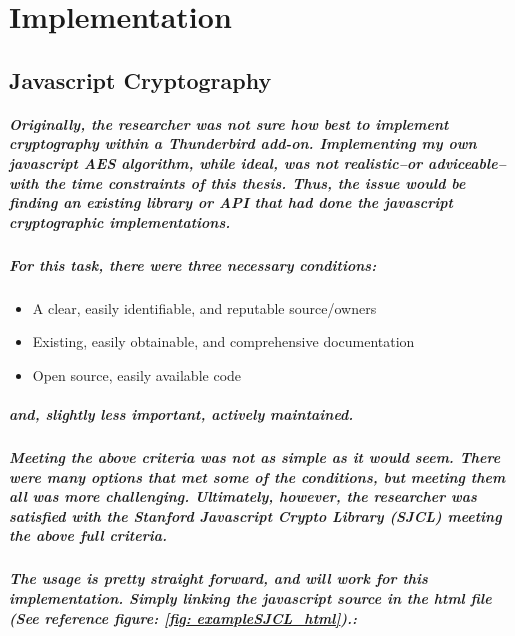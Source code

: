 \chapter{Implementation}



\section{Javascript Cryptography}

\paragraph{Originally, the researcher was not sure how best to implement cryptography within a Thunderbird add-on. Implementing my own javascript AES algorithm, while ideal, was not realistic--or adviceable--with the time constraints of this thesis. Thus, the issue would be finding an existing library or API that had done the javascript cryptographic implementations.}

\paragraph{For this task, there were three necessary conditions:}

\begin{itemize}
\item A clear, easily identifiable, and reputable source/owners
\item Existing, easily obtainable, and comprehensive documentation
\item Open source, easily available code
\end{itemize}

\paragraph{and, slightly less important, actively maintained.}

\paragraph{Meeting the above criteria was not as simple as it would seem. There were many options that met some of the conditions, but meeting them all was more challenging. Ultimately, however, the researcher was satisfied with the Stanford Javascript Crypto Library (SJCL) meeting the above full criteria.}\cite[Website]{SJCL}

\paragraph{The usage is pretty straight forward, and will work for this implementation. Simply linking the javascript source in the html file (See reference figure: \ref{fig: exampleSJCL_html}).:}

